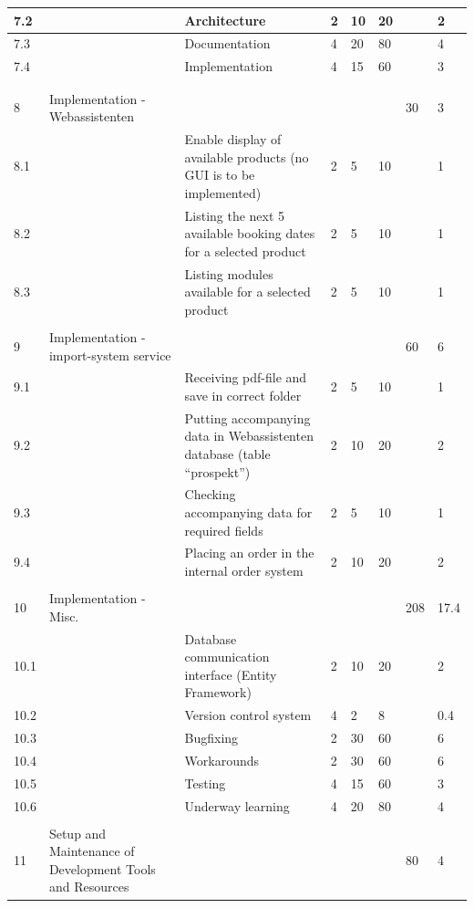 \begin{longtable}{|p{0.7cm}|p{3cm}|p{2cm}|p{2cm}|p{2cm}|p{2cm}|p{2cm}|p{2cm}|}
\hline
7.2 &  & Architecture & 2 & 10 & 20 &  & 2\\ 
\hline
7.3 &  & Documentation & 4 & 20 & 80 &  & 4\\ 
\hline
7.4 &  & Implementation & 4 & 15 & 60 &  & 3\\ 
\hline
 &  &  &  &  &  &  & \\ 
\hline
 &  &  &  &  &  &  & \\ 
\hline
8 & Implementation - Webassistenten &  &  &  &  & 30 & 3\\ 
\hline
8.1 &  & Enable display of available products (no GUI is to be implemented) & 2 & 5 & 10 &  & 1\\ 
\hline
8.2 &  & Listing the next 5 available booking dates for a selected product & 2 & 5 & 10 &  & 1\\ 
\hline
8.3 &  & Listing modules available for a selected product & 2 & 5 & 10 &  & 1\\ 
\hline
 &  &  &  &  &  &  & \\ 
\hline
9 & Implementation - import-system service &  &  &  &  & 60 & 6\\ 
\hline
9.1 &  & Receiving pdf-file and save in correct folder & 2 & 5 & 10 &  & 1\\ 
\hline
9.2 &  & Putting accompanying data in Webassistenten database (table “prospekt”) & 2 & 10 & 20 &  & 2\\ 
\hline
9.3 &  & Checking accompanying data for required fields & 2 & 5 & 10 &  & 1\\ 
\hline
9.4 &  & Placing an order in the internal order system & 2 & 10 & 20 &  & 2\\ 
\hline
 &  &  &  &  &  &  & \\ 
\hline
10 & Implementation - Misc. &  &  &  &  & 208 & 17.4\\ 
\hline
10.1 &  & Database communication interface (Entity Framework) & 2 & 10 & 20 &  & 2\\ 
\hline
10.2 &  & Version control system & 4 & 2 & 8 &  & 0.4\\ 
\hline
10.3 &  & Bugfixing & 2 & 30 & 60 &  & 6\\ 
\hline
10.4 &  & Workarounds & 2 & 30 & 60 &  & 6\\ 
\hline
10.5 &  & Testing & 4 & 15 & 60 &  & 3\\ 
\hline
10.6 &  & Underway learning & 4 & 20 & 80 &  & 4\\ 
\hline
 &  &  &  &  &  &  & \\ 
\hline
11 & Setup and Maintenance of Development Tools and Resources &  &  &  &  & 80 & 4\\ 

\end{longtable}
